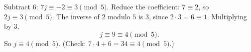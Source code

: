Subtract $6$: $7j\equiv-2\equiv3\pmod5$. Reduce the coefficient: $7\equiv2$, so $2j\equiv3\pmod5$. The inverse of $2$ modulo $5$ is $3$, since $2\cdot3=6\equiv1$. Multiplying by $3$,
\[j\equiv9\equiv4\pmod5.\]
So $\boxed{j\equiv4\pmod5}$. (Check: $7\cdot4+6=34\equiv4\pmod5$.)

